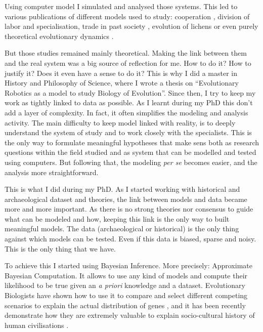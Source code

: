 \documentclass[10pt]{article}
\begin{document}
Using computer model I simulated and analysed those systems. This led to various publications of different models used to study: cooperation \cite{zibetti2015acaciaesanagentbasedmodelingandsimulationtoolforinvestigatingsocialbehaviorsinresourcelimitedtwodimensionalenvironments}, division of labor and specialisation\cite{montanier2016behavioralspecializationinembodiedevolutionaryroboticswhysodifficult,bredeche2017benefitsofproportionateselectioninembodiedevolutionacasestudywithbehaviouralspecialization}, trade in past society \cite{carrignon2015modelingthecoevolutionoftradeandcultureinpastsocieties}, evolution of lichens \cite{carrignon2016lichen} or even purely theoretical evolutionary dynamics \cite{medernach2015evolutionary,medernach2016evolution}.


But those studies remained mainly theoretical. Making the link between them and the real system was a big source of reflection for me.  How to do it? How to justify it? Does it even have a sense to do it? This is why I did a  master in History and Philosophy of Science, where I wrote a thesis on ``Evolutionary Robotics as a model to study Biology of Evolution''. Since then, I try to keep my work as tightly linked to data as possible. As I learnt during my PhD this don't add a layer of complexity. In fact, it often simplifies the modeling and analysis activity. The main difficulty to keep model linked with reality, is to deeply understand the system of study and to work closely with the specialists. This is the only way to formulate meaningful hypotheses that make sens both as research questions within the field studied and as system that can be modelled and tested using computers. But following that, the modeling \emph{per se} becomes easier, and the analysis more straightforward. 

This is what I did during my PhD. As I started working with historical and archaeological dataset and theories, the link between models and data became more and more important. As there is no strong theories nor consensus to guide what can be modeled and how, keeping this link is the only way to built meaningful models. The data (archaeological or historical) is the only thing against which models can be tested. Even if this data is biased, sparse and noisy. This is the only thing that we have. 

To achieve this I started using Bayesian Inference. More precisely: Approximate Bayesian Computation. It allows to use any kind of models and compute their likelihood to be true given an \emph{a priori} knowledge and a dataset. Evolutionary Biologists have shown how to use it to compare and select different competing scenarios to explain the actual distribution of genes \cite{beaumont2009adaptiveapproximatebayesiancomputation}, and it has been recently demonstrate how they are extremely valuable to explain socio-cultural history of human civilisations \cite{rubiocampillo2016modelselectioninhistoricalresearchusingapproximatebayesiancomputation,kandler2017inferringindividuallevelprocessesfrompopulationlevelpatternsinculturalevolution}.
\end{document}
